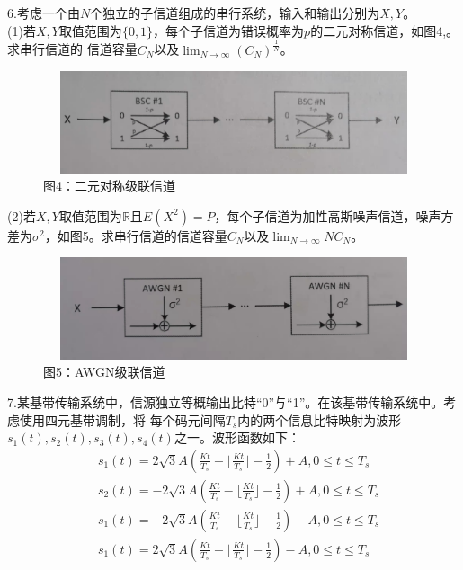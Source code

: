 \documentclass[UTF8]{ctexart}
\begin{document}
\section*{}
6.考虑一个由$N$个独立的子信道组成的串行系统，输入和输出分别为$X,Y$。\\
(1)若$X,Y$取值范围为$\{0,1\}$，每个子信道为错误概率为$p$的二元对称信道，如图4,。求串行信道的
信道容量$C_N$以及$\lim_{N\to\infty}(C_N)^{\frac{1}{N}}$。\\
\begin{figure}[H]
  \centering
  \includegraphics[width=12cm,height=3cm]{4.jpg}
  \caption*{图4：二元对称级联信道}
\end{figure}
(2)若$X,Y$取值范围为$\mathbb{R}$且$E(X^2)=P$，每个子信道为加性高斯噪声信道，噪声方差为$
  \sigma^2$，如图5。求串行信道的信道容量$C_N$以及$\lim_{N\to\infty}NC_N$。\\
\begin{figure}[H]
  \centering
  \includegraphics[width=12cm,height=3cm]{5.jpg}
  \caption*{图5：AWGN级联信道}
\end{figure}
7.某基带传输系统中，信源独立等概输出比特“0”与“1”。在该基带传输系统中。考虑使用四元基带调制，将
每个码元间隔$T_s$内的两个信息比特映射为波形$s_1(t),s_2(t),s_3(t),s_4(t)$之一。波形函数如下：
\begin{equation*}
  \begin{aligned}
     & s_1(t)=2\sqrt3A(\frac{Kt}{T_s}-\lfloor\frac{Kt}{T_s}\rfloor-\frac{1}{2})+A,
    0\leq t\leq T_s                                                                 \\
     & s_2(t)=-2\sqrt3A(\frac{Kt}{T_s}-\lfloor\frac{Kt}{T_s}\rfloor-\frac{1}{2})+A,
    0\leq t\leq T_s                                                                 \\
     & s_1(t)=-2\sqrt3A(\frac{Kt}{T_s}-\lfloor\frac{Kt}{T_s}\rfloor-\frac{1}{2})-A,
    0\leq t\leq T_s                                                                 \\
     & s_1(t)=2\sqrt3A(\frac{Kt}{T_s}-\lfloor\frac{Kt}{T_s}\rfloor-\frac{1}{2})-A,
    0\leq t\leq T_s                                                                 \\
  \end{aligned}
\end{equation*}
\end{document}
